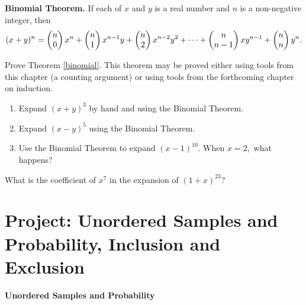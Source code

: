 \begin{thm} \label{binomial}
\textbf{Binomial Theorem.} If each of $x$ and $y$ is a real number and $n$ is a non-negative integer, then  \small
$$(x+y)^n = \begin{pmatrix} n \cr 0 \end{pmatrix} x^n + \begin{pmatrix} n \cr 1 \end{pmatrix} x^{n-1}y +
\begin{pmatrix} n \cr 2 \end{pmatrix} x^{n-2}y^2 + \dots + \begin{pmatrix} n \cr n-1 \end{pmatrix} x y^{n-1}
+ \begin{pmatrix} n \cr n \end{pmatrix} y^n.$$ \normalsize
\end{thm}

\begin{prb}
Prove Theorem \ref{binomial}.  This theorem may be proved either using tools from this chapter (a counting argument) or using tools from the forthcoming chapter on induction.
\end{prb}

\begin{prb}
\begin{enumerate}
\item Expand $(x + y)^3$ by hand and using the Binomial Theorem.
\item Expand $(x - y)^5$ using the Binomial Theorem.
\item Use the Binomial Theorem to expand $(x - 1)^{10}$.  When $x = 2,$ what happens?
\end{enumerate}
\end{prb}

\begin{prb}
What is the coefficient of $x^7$ in the expansion of $(1 + x)^{23}$?
\end{prb}


\section{Project: Unordered Samples and Probability, Inclusion and Exclusion}

\noindent
\textbf{Unordered Samples and Probability}

